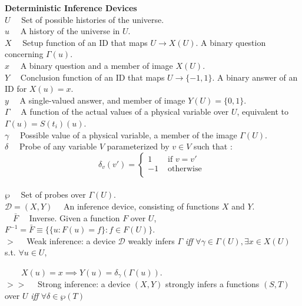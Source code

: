 \documentclass[11pt]{article}
\begin{document}
\textbf{Deterministic Inference Devices} \\
$ U \quad $ Set of possible histories of the universe. \\
$ u \quad $ A history of the universe in $ U $. \\ 
$ X \quad $ Setup function of an ID that maps $ U \rightarrow X(U) $. A binary question concerning $ \Gamma(u) $. \\
$ x \quad $ A binary question and a member of image $ X(U) $. \\ 
$ Y \quad $ Conclusion function of an ID that maps $ U \rightarrow \{-1, 1\} $. A binary answer of an ID for  $ X(u) = x $. \\ 
$ y \quad $ A single-valued answer, and member of image $ Y(U)  = \{0, 1\} $. \\ 
$ \Gamma \quad $ A function of the actual values of a physical variable over $U$, equivalent to $\Gamma(u) = S(t_i)(u)$.  \\
$ \gamma \quad $ Possible value of a physical variable, a member of the image $\Gamma(U)$. \\
$ \delta \quad $ Probe of any variable $V$ parameterized by $v \in V$ such that : 
	  \[ \delta_v (v') =
	  \begin{cases} 
       1 & \text{ if } v = v' \\
       -1 & \text{ otherwise } \\
      \end{cases}\] \\
$ \wp \quad $ Set of probes over $\Gamma(U)$. \\
$ \mathcal{D} = (X, Y) \quad $ An inference device, consisting of functions $ X $ and $ Y $. \\
$ \quad \bar{F} \quad $ Inverse. Given a function $ F $ over $ U $, $F ^ {-1} = \bar{F} \equiv \{\{u : F(u) = f \} : f \in F(U) \} $. \\
$ > \quad $ Weak inference: a device $\mathcal{D}$ weakly infers $\Gamma$ \textit{iff} $ \forall \gamma \in \Gamma(U), \exists x \in X(U) $ s.t. $ \forall u \in U $, 

$ \quad \quad X(u) = x \implies Y(u) = \delta_{\gamma}(\Gamma(u)) $.  \\
$ >> \quad $ Strong inference: a device $ (X, Y) $ strongly infers a functions $ (S, T) $ over $ U $ \textit{ iff } $\forall \delta \in \wp(T) $ 
\end{document}
